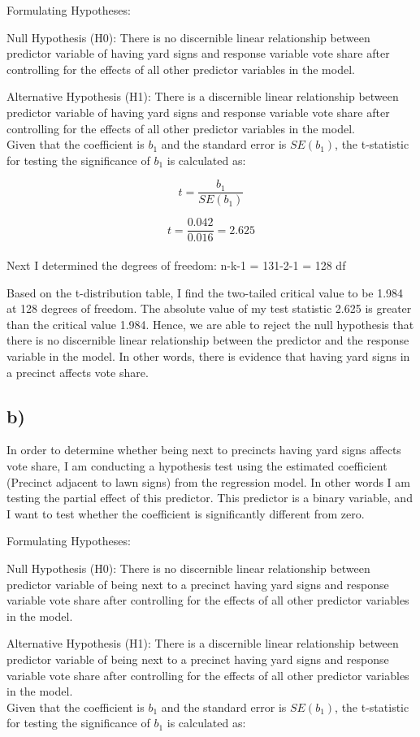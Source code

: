 \documentclass[oneside]{article}
\begin{document}
\noindent 
Formulating Hypotheses:

Null Hypothesis (H0): There is no discernible linear relationship between predictor variable of having yard signs and response variable vote share after controlling for the effects of all other predictor variables in the model. 

Alternative Hypothesis (H1): There is a discernible linear relationship between predictor variable of having yard signs and response variable vote share after controlling for the effects of all other predictor variables in the model. 
\\
Given that the coefficient is $b_1$ and the standard error is $SE(b_1)$, the t-statistic for testing the significance of $b_1$ is calculated as:

\[ t = \frac{b_1}{SE(b_1)} \]

\[ t = \frac{0.042}{0.016} = 2.625\]
\\
Next I determined the degrees of freedom: n-k-1 = 131-2-1 = 128 df

Based on the t-distribution table, I find the two-tailed critical value to be 1.984 at 128 degrees of freedom. The absolute value of my test statistic 2.625 is greater than the critical value 1.984. Hence, we are able to reject the null hypothesis that there is no discernible linear relationship between the predictor and the response variable in the model. In other words, there is evidence that having yard signs in a precinct affects vote share.

\subsection*{b)}

In order to determine whether being next to precincts having yard signs affects vote share, I am conducting a hypothesis test using the estimated coefficient (Precinct adjacent to lawn signs) from the regression model. In other words I am testing the partial effect of this predictor. 
This predictor is a binary variable, and I want to test whether the coefficient is significantly different from zero.

\noindent 
Formulating Hypotheses:

Null Hypothesis (H0): There is no discernible linear relationship between predictor variable of being next to a precinct having yard signs and response variable vote share after controlling for the effects of all other predictor variables in the model. 

Alternative Hypothesis (H1): There is a discernible linear relationship between predictor variable of being next to a precinct having yard signs and response variable vote share after controlling for the effects of all other predictor variables in the model. 
\\
Given that the coefficient is $b_1$ and the standard error is $SE(b_1)$, the t-statistic for testing the significance of $b_1$ is calculated as:
\end{document}
